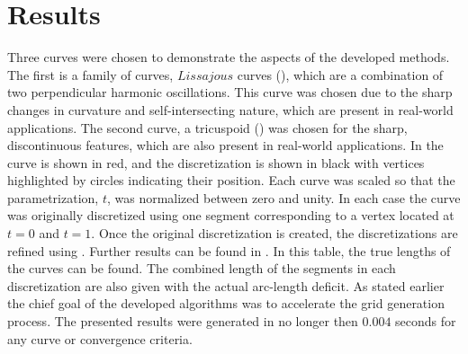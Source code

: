 \section{Results}
Three curves were chosen to demonstrate the aspects of the developed 
methods. The first is a family of curves, $Lissajous$ curves 
(), which are a combination of two perpendicular 
harmonic oscillations. This curve was chosen due to the sharp changes in 
curvature and self-intersecting nature, which are present in real-world 
applications. The second curve, a tricuspoid 
() was chosen for the sharp, discontinuous features, 
which are also present in real-world applications. 
In  the curve is shown in red, and the discretization is shown in black with vertices highlighted by circles indicating their position. Each curve was scaled so that the parametrization, $t$, was normalized between zero and unity. In each case the curve was originally discretized using one segment corresponding to a vertex located at $t=0$ and $t=1$. Once the original discretization is created, the discretizations are refined using . Further results can be found in . In this table, the true lengths of the curves can be found. The combined length of the segments in each discretization are also given with the actual arc-length deficit. As stated earlier the chief goal of the developed algorithms was to accelerate the grid generation process. The presented results were generated in no longer then $0.004$ seconds for any curve or convergence criteria.

